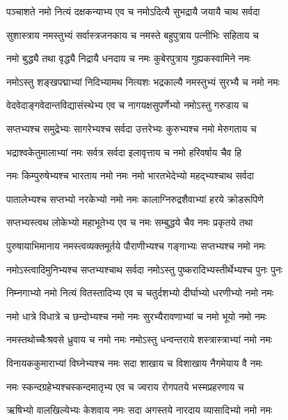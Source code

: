 \twolineshloka
{पञ्चाशते नमो नित्यं दक्षकन्याभ्य एव च}
{नमोऽदित्यै सुभद्रायै जयायै चाथ सर्वदा}

\twolineshloka
{सुशास्त्राय नमस्तुभ्यं सर्वास्त्रजनकाय च}
{नमस्ते बहुपुत्राय पत्नीभिः सहिताय च}

\twolineshloka
{नमो बुद्ध्यै तथा वृद्ध्यै निद्रायै धनदाय च}
{नमः कुबेरपुत्राय\footnotemark{} गुह्यकस्वामिने नमः}

\twolineshloka
{नमोऽस्तु शङ्खपद्माभ्यां निदिभ्यामथ नित्यशः}
{भद्रकाल्यै नमस्तुभ्यं सुरभ्यै च नमो नमः}

\twolineshloka
{वेदवेदाङ्गवेदान्तविद्यासंस्थेभ्य एव च}
{नागयक्षसुपर्णेभ्यो नमोऽस्तु गरुडाय च}

\twolineshloka
{सप्तभ्यश्च समुद्रेभ्यः सागरेभ्यश्च सर्वदा}
{उत्तरेभ्यः कुरुभ्यश्च नमो मेरुगताय\footnotemark{} च}

\twolineshloka
{भद्राश्वकेतुमालाभ्यां नमः सर्वत्र सर्वदा}
{इलावृत्ताय च नमो हरिवर्षाय चैव हि}

\twolineshloka
{नमः किम्पुरुषेभ्यश्च भारताय नमो नमः}
{नमो भारतभेदेभ्यो\footnotemark{}  महद्भ्यश्चाथ सर्वदा}

\twolineshloka
{पातालेभ्यश्च सप्तभ्यो नरकेभ्यो नमो नमः}
{कालाग्निरुद्रशैवाभ्यां हरये क्रोडरूपिणे}

\twolineshloka
{सप्तभ्यस्त्वथ लोकेभ्यो महाभूतेभ्य एव च}
{नमः सम्बुद्धये चैव नमः प्रकृतये तथा}

\twolineshloka
{पुरुषायाभिमानाय नमस्त्वव्यक्तमूर्तये}
{पौराणीभ्यश्च गङ्गाभ्यः सप्तभ्यश्च नमो नमः}

\twolineshloka
{नमोऽस्त्वादिमुनिभ्यश्च सप्तभ्यश्चाथ सर्वदा}
{नमोऽस्तु पुष्करादिभ्यस्तीर्थेभ्यश्च पुनः पुनः}

\twolineshloka
{निम्नगाभ्यो नमो नित्यं वितस्तादिभ्य एव च}
{चतुर्दशभ्यो दीर्घाभ्यो धरणीभ्यो नमो नमः}

\twolineshloka
{नमो धात्रे विधात्रे च छन्दोभ्यश्च नमो नमः}
{सुरभ्यैरावणाभ्यां च नमो भूयो नमो नमः}

\twolineshloka
{नमस्तथोच्चैःश्रवसे ध्रुवाय च नमो नमः}
{नमोऽस्तु धन्वन्तराये शस्त्रास्त्राभ्यां नमो नमः}

\twolineshloka
{विनायककुमाराभ्यां विघ्नेभ्यश्च नमः सदा}
{शाखाय च विशाखाय नैगमेयाय वै नमः}

\twolineshloka
{नमः स्कन्दग्रहेभ्यश्चस्कन्दमातृभ्य एव च}
{ज्वराय रोगपतये भस्मप्रहरणाय च}

\twolineshloka
{ऋषिभ्यो वालखिल्येभ्यः केशवाय नमः सदा}
{अगस्तये नारदाय व्यासादिभ्यो नमो नमः}

